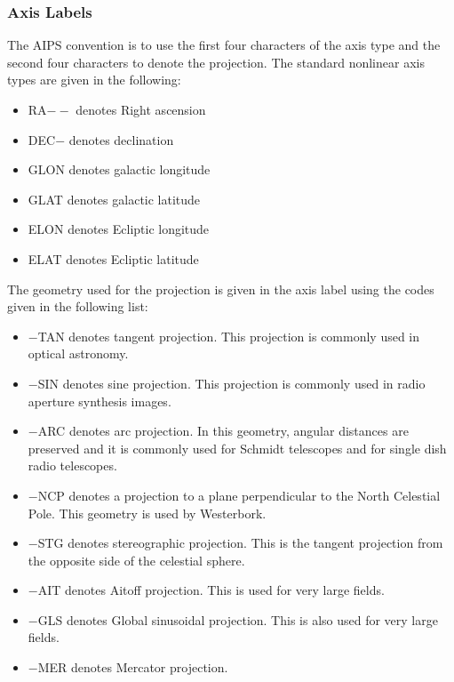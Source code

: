 \subsubsection{Axis Labels}
The AIPS convention is to use the first four characters of the axis
type and the second four characters to denote the projection.  The
standard nonlinear axis types are given in the following:
\begin{itemize} %
\item RA$--$ denotes Right ascension
\item DEC$-$ denotes declination
\item GLON denotes galactic longitude
\item GLAT denotes galactic latitude
\item ELON denotes Ecliptic longitude
\item ELAT denotes Ecliptic latitude

\end{itemize} %
The geometry used for the projection is given in the axis label using
the codes given in the following list:
\begin{itemize} %
\item $-$TAN denotes tangent projection.  This projection is commonly used in
optical astronomy.
\item $-$SIN denotes sine projection.  This projection is commonly used in
radio aperture synthesis images.
\item $-$ARC denotes arc projection.  In this geometry, angular distances are
preserved and it is commonly used for Schmidt telescopes and for
single dish radio telescopes.
\item $-$NCP denotes a projection to a plane perpendicular to the North
Celestial Pole.  This geometry is used by Westerbork.
\item $-$STG denotes stereographic projection.  This is the tangent
projection from the opposite side of the celestial sphere.
\item $-$AIT denotes Aitoff projection.  This is used for very large fields.
\item $-$GLS denotes Global sinusoidal projection. This is also used for very
large fields.
\item $-$MER denotes Mercator projection.
\end{itemize} %
